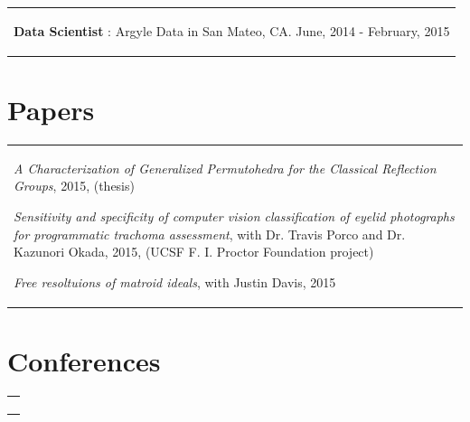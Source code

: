 \documentclass[margin,line,pifont,palatino,courier]{res}
\newenvironment{list1}{
  \begin{list}{\label{ } }{
      \setlength{\itemsep}{0in}
      \setlength{\parsep}{0in} \setlength{\parskip}{0in}
      \setlength{\topsep}{0in} \setlength{\partopsep}{0in}
      \setlength{\leftmargin}{0.0in} } }{\end{list} }
\begin{document}
\begin{resume}
\begin{tabular}{@{}p{5in}}
\begin{list1}
       
      \item {\bf Data Scientist }:  Argyle Data in San Mateo, CA. June, 2014 - February, 2015
      \vspace{.2em}
    
  \end{list1}
\end{tabular}

\section{\sc Papers}
  \begin{tabular}{@{}p{5in}}
    \begin{list1}
      
      
        
            \item {\em A Characterization of Generalized Permutohedra for the Classical Reflection Groups},  2015, (thesis)  
        
      \vspace{.5em}
      
        
      \vspace{.5em}
      
        
      \vspace{.5em}
      
        
            \item {\em Sensitivity and specificity of computer vision classification of eyelid photographs for programmatic trachoma assessment},  with Dr. Travis Porco and Dr. Kazunori Okada,  2015, (UCSF F. I. Proctor Foundation project)  
        
      \vspace{.5em}
      
        
            \item {\em Free resoltuions of matroid ideals},  with Justin Davis,  2015 
        
      \vspace{.5em}
      
    \end{list1}
  \end{tabular}



\section{\sc Conferences}
  \begin{tabular}{@{}p{5in}}
    \begin{list1}
    

\end{list1}
\end{tabular}
\end{resume}
\end{document}
